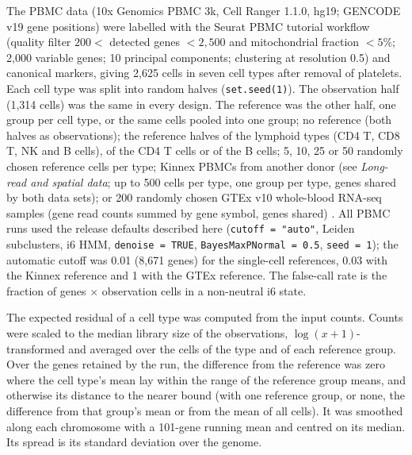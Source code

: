 The PBMC data (10x Genomics PBMC 3k, Cell Ranger 1.1.0, hg19; GENCODE v19 gene positions) were labelled with the Seurat PBMC tutorial workflow (quality filter $200 <$ detected genes $< 2{,}500$ and mitochondrial fraction $< 5\%$; 2,000 variable genes; 10 principal components; clustering at resolution 0.5) and canonical markers, giving 2,625 cells in seven cell types after removal of platelets. Each cell type was split into random halves (\texttt{set.seed(1)}). The observation half (1,314 cells) was the same in every design. The reference was the other half, one group per cell type, or the same cells pooled into one group; no reference (both halves as observations); the reference halves of the lymphoid types (CD4 T, CD8 T, NK and B cells), of the CD4 T cells or of the B cells; 5, 10, 25 or 50 randomly chosen reference cells per type; Kinnex PBMCs from another donor (see \emph{Long-read and spatial data}; up to 500 cells per type, one group per type, genes shared by both data sets); or 200 randomly chosen GTEx v10 whole-blood RNA-seq samples (gene read counts summed by gene symbol, genes shared) \citep{gtex2020}. All PBMC runs used the release defaults described here (\texttt{cutoff\ =\ "auto"}, Leiden subclusters, i6 HMM, \texttt{denoise\ =\ TRUE}, \texttt{BayesMaxPNormal\ =\ 0.5}, \texttt{seed\ =\ 1}); the automatic cutoff was 0.01 (8,671 genes) for the single-cell references, 0.03 with the Kinnex reference and 1 with the GTEx reference. The false-call rate is the fraction of genes $\times$ observation cells in a non-neutral i6 state.

The expected residual of a cell type was computed from the input counts. Counts were scaled to the median library size of the observations, $\log(x+1)$-transformed and averaged over the cells of the type and of each reference group. Over the genes retained by the run, the difference from the reference was zero where the cell type's mean lay within the range of the reference group means, and otherwise its distance to the nearer bound (with one reference group, or none, the difference from that group's mean or from the mean of all cells). It was smoothed along each chromosome with a 101-gene running mean and centred on its median. Its spread is its standard deviation over the genome.

